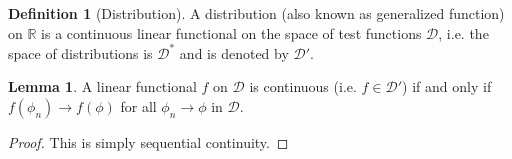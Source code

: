\documentclass[]{article}
\theoremstyle{definition}
\theoremstyle{definition}
\newtheorem{definition}{Definition}[section]
\newtheorem{lemma}{Lemma}[section]
\begin{document}
\begin{definition}[Distribution]
  A distribution (also known as generalized function) on \(\mathbb{R}\) is a 
  continuous linear functional on the space of test functions \(\mathcal{D}\),
  i.e. the space of distributions is \(\mathcal{D}^*\) and is denoted by 
  \(\mathcal{D}'\). 
\end{definition}

\begin{lemma}
  A linear functional \(f\) on \(\mathcal{D}\) is continuous 
  (i.e. \(f \in \mathcal{D}'\)) if and only if \(f(\phi_n) \to f(\phi)\) 
  for all \(\phi_n \to \phi\) in \(\mathcal{D}\). 
\end{lemma}
\begin{proof}
  This is simply sequential continuity.
\end{proof}
\end{document}
